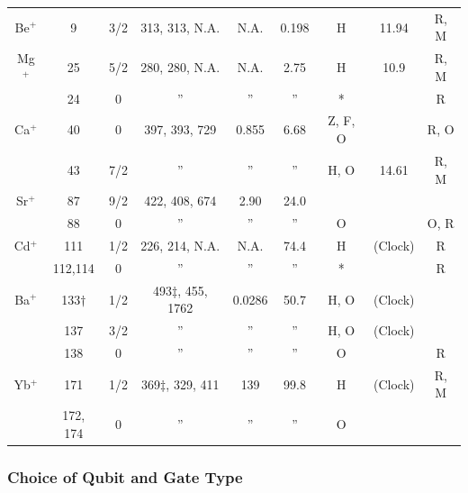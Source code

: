 \documentclass[%
12pt,
 amsmath,amssymb,
]{revtex4-2}
\begin{document}
\begin{table}[t b h !]
\begin{ruledtabular}
\begin{tabular}{ccccccccc}
\rule{0pt}{4ex}Be$^{+}$ &  9  & 3/2 &  313, 313, N.A.  & N.A. & 0.198  &  H  &  11.94 & R, M\\
\rule{0pt}{4ex}Mg$^{+}$ &  25   & 5/2 &  280, 280, N.A.  & N.A. & 2.75  &  H  &  10.9  & R, M\\
         &  24   &  0 & '' &  '' & ''  &  *  &   & R\\
\rule{0pt}{4ex}Ca$^{+}$ &  40   & 0 &  397, 393, 729  & 0.855 & 6.68  &  Z, F, O  &   & R, O\\
         &  43   & 7/2 & ''  & '' &  ''  &  H, O  &  14.61 &  R, M\\
\rule{0pt}{4ex}Sr$^{+}$ &  87 & 9/2 &  422, 408, 674  & 2.90  & 24.0  &   &  & \\
         &  88   &  0 & '' & '' & ''  &  O  &   &  O, R\\
\rule{0pt}{4ex}Cd$^{+}$ &  111  & 1/2 &  226, 214, N.A.  & N.A.  & 74.4  &  H  & (Clock) & R \\
         &  112,114  & 0 & ''  & '' & ''   &   *   &  & R \\
\rule{0pt}{4ex}Ba$^{+}$ &  133$\dagger$ & 1/2 &  493$\ddagger$, 455, 1762  & 0.0286 & 50.7  &  H, O  &  (Clock) &  \\
         &  137  &  3/2 & '' & '' & '' &  H, O  &  (Clock) & \\
         &  138  &  0 & ''  & ''  & '' & O  &   & R\\
\rule{0pt}{4ex}Yb$^{+}$ &  171  & 1/2 & 369$\ddagger$, 329, 411  & 139 & 99.8  &  H  &  (Clock) & R, M\\
         &  172, 174  & 0 & '' & '' & '' & O  &   & \\

\end{tabular}
\end{ruledtabular}

\label{tab:ion_props}
\end{table}

\subsubsection{Choice of Qubit and Gate Type}
\end{document}
